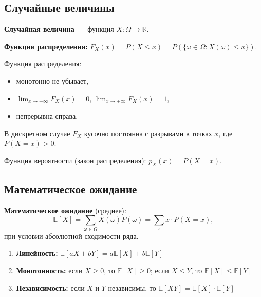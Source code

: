 \documentclass[12pt]{article}
\begin{document}
	\subsection{Случайные величины}
	
	\begin{definition}
		\textbf{Случайная величина}~--- функция $X: \Omega \to \mathbb{R}$.
	\end{definition}
	
	\begin{definition}
		\textbf{Функция распределения:} $F_X(x) = P(X \leqslant x) = P(\{\omega \in \Omega : X(\omega) \leqslant x\})$.
	\end{definition}
	
	\begin{note}
		Функция распределения:
		\begin{itemize}
			\item монотонно не убывает,
			\item $\lim_{x \to -\infty} F_X(x) = 0$, $\lim_{x \to +\infty} F_X(x) = 1$,
			\item непрерывна справа.
		\end{itemize}
		В дискретном случае $F_X$ кусочно постоянна с разрывами в точках $x$, где $P(X = x) > 0$.
	\end{note}
	
	\begin{definition}
		Функция вероятности (закон распределения): $p_X(x) = P(X = x)$.
	\end{definition}
	
	\subsection{Математическое ожидание}
	
	\begin{definition}
		\textbf{Математическое ожидание} (среднее):
		\[\mathbb{E}[X] = \sum_{\omega \in \Omega} X(\omega) P(\omega) = \sum_{x} x \cdot P(X = x),\]
		при условии абсолютной сходимости ряда.
	\end{definition}
	
	\begin{theorem}
		\begin{enumerate}
			\item \textbf{Линейность:} $\mathbb{E}[aX + bY] = a\mathbb{E}[X] + b\mathbb{E}[Y]$
			\item \textbf{Монотонность:} если $X \geqslant 0$, то $\mathbb{E}[X] \geqslant 0$; если $X \leqslant Y$, то $\mathbb{E}[X] \leqslant \mathbb{E}[Y]$
			\item \textbf{Независимость:} если $X$ и $Y$ независимы, то $\mathbb{E}[XY] = \mathbb{E}[X] \cdot \mathbb{E}[Y]$
		\end{enumerate}
	\end{theorem}
	
\end{document}
